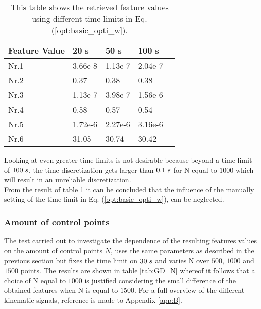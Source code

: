 \begin{table}[h!]
	\centering
	\begin{tabular}{@{}llllr@{}} \toprule
		\textbf{Feature Value}    & 20 s  & 50 s      & 100 s\\ \midrule
		Nr.1       & 3.66e-8     & 1.13e-7   & 2.04e-7\\
		Nr.2       & 0.37        & 0.38      & 0.38\\
		Nr.3       & 1.13e-7     & 3.98e-7   & 1.56e-6 \\
		Nr.4       & 0.58        & 0.57      & 0.54\\
		Nr.5       & 1.72e-6     & 2.27e-6   & 3.16e-6\\
		Nr.6       & 31.05       & 30.74     & 30.42\\ \bottomrule
	\end{tabular}
	\caption{This table shows the retrieved feature values using different time limits in Eq. (\ref{opt:basic_opti_w}).}
	\label{tab:GD_time_limit}
\end{table}
Looking at even greater time limits is not desirable because beyond a time limit of $100 \hspace{1mm}s$, the time discretization gets larger than $0.1\hspace{1mm}s$ for N equal to $1000$ which will result in an unreliable discretization.\\

From the result of table \ref{tab:GD_time_limit} it can be concluded that the influence of the manually setting of the time limit in Eq. (\ref{opt:basic_opti_w}), can be neglected. 


\subsubsection{Amount of control points}
The test carried out to investigate the dependence of the resulting features values on the amount of control points $N$, uses the same parameters as described in the previous section but fixes the time limit on $30\hspace{1mm}s$ and varies N over $500$, $1000$ and $1500$ points. The results are shown in table \ref{tab:GD_N} whereof it follows that a choice of N equal to $1000$ is justified considering the small difference of the obtained features when N is equal to $1500$. For a full overview of the different kinematic signals, reference is made to Appendix \ref{app:B}.

